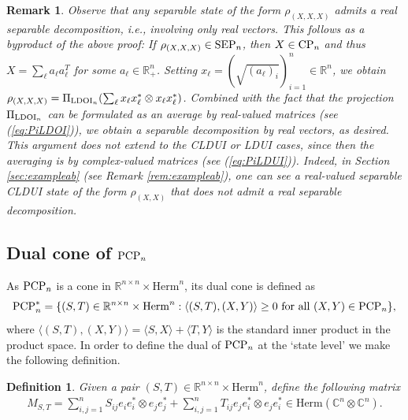 \documentclass[11pt]{article}
\newcommand{\R}{\ensuremath{\mathbb{R}}}   %
\newcommand{\C}{\ensuremath{\mathbb{C}}} %
\newcommand{\Herm}{\mathrm{Herm}}
\newcommand{\Cnn}{\C^n\ot \C^n}
\newcommand{\PCP}{\text{\rm PCP}}
\newcommand{\SEP}{\text{\rm SEP}}
\newcommand{\CP}{\text{\rm CP}}
\newcommand{\LDOI}{\text{\rm LDOI}}
\newcommand{\ot}{\otimes}
\theoremstyle{plain}
\newtheorem{definition}[satz]{Definition}
\newtheorem{remark}[satz]{Remark}
\newcommand{\ML}{\textcolor{blue}}
\begin{document}
\begin{remark}
Observe that any separable state of the form $\rho_{(X,X,X)}$ admits a real separable decomposition, i.e., involving only real vectors. This follows as a byproduct of the above proof: If $\rho_{(X,X,X)}\in \SEP_n$, then $X\in \CP_n$ and thus $X=\sum_\ell a_\ell a_\ell^T$ for some $a_\ell\in \R^n_+$. Setting $x_\ell =(\sqrt{(a_\ell)_i})_{i=1}^n\in\R^n$, we obtain 
$\rho_{(X,X,X)}= \Pi_{\LDOI_n}(\sum_\ell x_\ell x_\ell ^*\ot x_\ell x_\ell ^*)$. Combined with the fact that the projection $\Pi_{\LDOI_n}$ can be formulated as an average by real-valued matrices  (see (\ref{eq:PiLDOI})), we obtain  a separable decomposition by real vectors, as desired. This argument does not extend to the CLDUI or LDUI cases, since then the averaging is by complex-valued matrices (see (\ref{eq:PiLDUI})). Indeed, in Section \ref{sec:exampleab} (see Remark \ref{rem:exampleab}), one can see a real-valued separable CLDUI state of the form $\rho_{(X,X)}$ that does not admit a real separable decomposition.
\end{remark}

\subsection{Dual cone of $\PCP_n$} 

As $\PCP_n$ is a cone in $  \R^{n\times n}\times\Herm^n$,  its dual cone is defined as
$$\PCP_n^*=\{(S,T)\in  \R^{n\times n}\times \Herm^n: \langle (S,T),(X,Y)\rangle \ge 0 \text{ for all } (X,Y)\in \PCP_n\},$$
where $\langle (S,T),(X,Y)\rangle=\langle S,X\rangle +\langle T,Y\rangle$ is the standard inner product in the product space. In order to define the dual of $\PCP_n$ at the `state level' we make  the following definition.

	\begin{definition}\label{def:MST}
		Given a pair  $(S,T)\in \R^{n\times n}\times \Herm^n $, define  the following matrix 
		\begin{align}\label{eq:MST}
M_{S,T}=
 \sum_{i,j=1}^nS_{ij}e_ie_i^*\otimes e_je_j^*
+\sum_{i,j=1}^nT_{ij}e_je_i^*\otimes e_je_i^* \in \Herm(\Cnn).
		\end{align}
	\end{definition}
\end{document}
